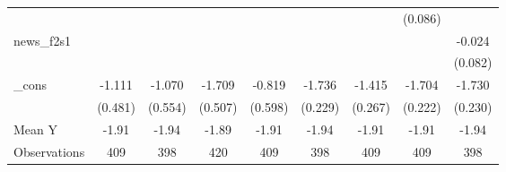 {\begin{tabular}{l*{8}{c}}
            &                     &                     &                     &                     &                     &                     &     (0.086)         &                     \\
\addlinespace
news\_f2s1   &                     &                     &                     &                     &                     &                     &                     &      -0.024         \\
            &                     &                     &                     &                     &                     &                     &                     &     (0.082)         \\
\addlinespace
\_cons      &      -1.111\sym{**} &      -1.070\sym{*}  &      -1.709\sym{***}&      -0.819         &      -1.736\sym{***}&      -1.415\sym{***}&      -1.704\sym{***}&      -1.730\sym{***}\\
            &     (0.481)         &     (0.554)         &     (0.507)         &     (0.598)         &     (0.229)         &     (0.267)         &     (0.222)         &     (0.230)         \\
\midrule
Mean Y      &       -1.91         &       -1.94         &       -1.89         &       -1.91         &       -1.94         &       -1.91         &       -1.91         &       -1.94         \\
Observations&         409         &         398         &         420         &         409         &         398         &         409         &         409         &         398         \\
\bottomrule
\end{tabular}
}
